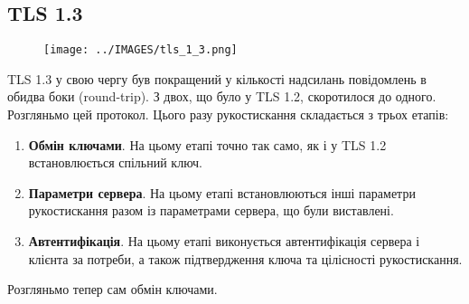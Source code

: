 \subsection{TLS 1.3}
\begin{figure}[ht]
        \centering
        \texttt{[image: ../IMAGES/tls\_1\_3.png]}
        \label{tls_1_3}
\end{figure}
TLS 1.3 у свою чергу був покращений у кількості надсилань повідомлень в обидва боки (round-trip). З двох, що було у TLS 1.2, скоротилося до одного. Розгляньмо цей протокол.
Цього разу рукостискання складається з трьох етапів:
\begin{enumerate}
    \item \textbf{Обмін ключами}. На цьому етапі точно так само, як і у TLS 1.2 встановлюється спільний ключ.
    \item \textbf{Параметри сервера}. На цьому етапі встановлюються інші параметри рукостискання разом із параметрами сервера, що були виставлені.
    \item \textbf{Автентифікація}. На цьому етапі виконується автентифікація сервера і клієнта за потреби, а також підтвердження ключа та цілісності рукостискання.
\end{enumerate}
Розгляньмо тепер сам обмін ключами.
